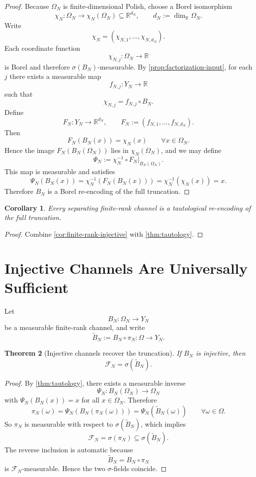 \documentclass[11pt,a4paper]{article}
\newtheorem{theorem}{Theorem}[section]
\newtheorem{corollary}[theorem]{Corollary}
\theoremstyle{definition}
\theoremstyle{remark}
\newcommand{\cF}{\mathcal F}
\newcommand{\R}{\mathbb R}
\begin{document}
\begin{proof}
Because $\Omega_N$ is finite-dimensional Polish, choose a Borel
isomorphism
\[
\chi_N:\Omega_N\to \chi_N(\Omega_N)\subseteq \R^{d_N},
\qquad d_N:=\dim_{\R}\Omega_N.
\]
Write
\[
\chi_N=(\chi_{N,1},\dots,\chi_{N,d_N}).
\]
Each coordinate function
\[
\chi_{N,j}:\Omega_N\to \R
\]
is Borel and therefore $\sigma(B_N)$-measurable.  By
\cref{prop:factorization-input}, for each $j$ there exists a measurable
map
\[
f_{N,j}:Y_N\to \R
\]
such that
\[
\chi_{N,j}=f_{N,j}\circ B_N.
\]
Define
\[
F_N:Y_N\to \R^{d_N},
\qquad
F_N:=(f_{N,1},\dots,f_{N,d_N}).
\]
Then
\[
F_N(B_N(x))=\chi_N(x)
\qquad
\forall x\in\Omega_N.
\]
Hence the image $F_N(B_N(\Omega_N))$ lies in $\chi_N(\Omega_N)$, and we
may define
\[
\Psi_N:=\chi_N^{-1}\circ F_N\big|_{B_N(\Omega_N)}.
\]
This map is measurable and satisfies
\[
\Psi_N(B_N(x))
=
\chi_N^{-1}(F_N(B_N(x)))
=
\chi_N^{-1}(\chi_N(x))
=
x.
\]
Therefore $B_N$ is a Borel re-encoding of the full truncation.
\end{proof}

\begin{corollary}
\label{cor:tautology-from-separation}
Every separating finite-rank channel is a tautological re-encoding of the
full truncation.
\end{corollary}

\begin{proof}
Combine \cref{cor:finite-rank-injective} with \cref{thm:tautology}.
\end{proof}

\section{Injective Channels Are Universally Sufficient}

Let
\[
B_N:\Omega_N\to Y_N
\]
be a measurable finite-rank channel, and write
\[
\widetilde B_N:=B_N\circ \pi_N:\Omega\to Y_N.
\]

\begin{theorem}[Injective channels recover the truncation]
\label{thm:recover-truncation}
If $B_N$ is injective, then
\[
\cF_N=\sigma(\widetilde B_N).
\]
\end{theorem}

\begin{proof}
By \cref{thm:tautology}, there exists a measurable inverse
\[
\Psi_N:B_N(\Omega_N)\to\Omega_N
\]
with $\Psi_N(B_N(x))=x$ for all $x\in\Omega_N$.  Therefore
\[
\pi_N(\omega)
=
\Psi_N(B_N(\pi_N(\omega)))
=
\Psi_N(\widetilde B_N(\omega))
\qquad
\forall \omega\in\Omega.
\]
So $\pi_N$ is measurable with respect to $\sigma(\widetilde B_N)$, which
implies
\[
\cF_N=\sigma(\pi_N)\subseteq \sigma(\widetilde B_N).
\]
The reverse inclusion is automatic because
\[
\widetilde B_N=B_N\circ \pi_N
\]
is $\cF_N$-measurable.  Hence the two $\sigma$-fields coincide.
\end{proof}
\end{document}
